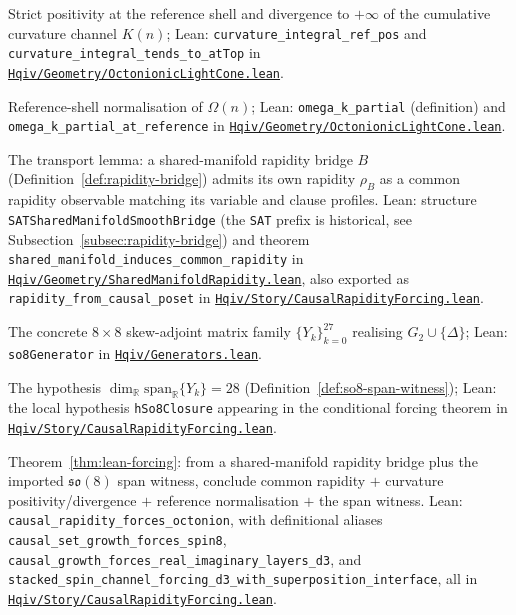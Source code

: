 \documentclass[11pt]{amsart}
\newcommand{\leanrepo}{https://github.com/HQIV/hqiv-lean/blob/main}
\newcommand{\leanfile}[1]{\href{\leanrepo/#1}{\nolinkurl{#1}}}
\newcommand{\leanid}[1]{\nolinkurl{#1}}
\begin{document}
\begin{description}[leftmargin=*]
  \item[\phantomsection\label{lean:curvature-int}\textbf{Curvature integral positivity and divergence.}]
    Strict positivity at the reference shell and divergence to \(+\infty\) of the cumulative curvature channel \(K(n)\); Lean: \leanid{curvature_integral_ref_pos} and \leanid{curvature_integral_tends_to_atTop} in \leanfile{Hqiv/Geometry/OctonionicLightCone.lean}.

  \item[\phantomsection\label{lean:omega-ref}\textbf{Reference-shell $\Omega = 1$ identity.}]
    Reference-shell normalisation of \(\Omega(n)\); Lean: \leanid{omega_k_partial} (definition) and \leanid{omega_k_partial_at_reference} in \leanfile{Hqiv/Geometry/OctonionicLightCone.lean}.

  \item[\phantomsection\label{lean:rapidity-induces}\textbf{Shared-rapidity transport lemma.}]
    The transport lemma: a shared-manifold rapidity bridge \(B\) (Definition~\ref{def:rapidity-bridge}) admits its own rapidity \(\rho_B\) as a common rapidity observable matching its variable and clause profiles. Lean: structure \leanid{SATSharedManifoldSmoothBridge} (the \texttt{SAT} prefix is historical, see Subsection~\ref{subsec:rapidity-bridge}) and theorem \leanid{shared_manifold_induces_common_rapidity} in \leanfile{Hqiv/Geometry/SharedManifoldRapidity.lean}, also exported as \leanid{rapidity_from_causal_poset} in \leanfile{Hqiv/Story/CausalRapidityForcing.lean}.

  \item[\phantomsection\label{lean:so8-generators}\textbf{Octonionic seed (28-generator family).}]
    The concrete \(8\times 8\) skew-adjoint matrix family \(\{Y_k\}_{k=0}^{27}\) realising \(G_2\cup\{\Delta\}\); Lean: \leanid{so8Generator} in \leanfile{Hqiv/Generators.lean}.

  \item[\phantomsection\label{lean:so8-witness}\textbf{Imported $\mathfrak{so}(8)$ span witness.}]
    The hypothesis \(\dim_{\mathbb{R}}\mathrm{span}_{\mathbb{R}}\{Y_k\}=28\) (Definition~\ref{def:so8-span-witness}); Lean: the local hypothesis \leanid{hSo8Closure} appearing in the conditional forcing theorem in \leanfile{Hqiv/Story/CausalRapidityForcing.lean}.

  \item[\phantomsection\label{lean:forcing-theorem}\textbf{Conditional forcing theorem.}]
    Theorem~\ref{thm:lean-forcing}: from a shared-manifold rapidity bridge plus the imported \(\mathfrak{so}(8)\) span witness, conclude common rapidity \(+\) curvature positivity/divergence \(+\) reference normalisation \(+\) the span witness. Lean: \leanid{causal_rapidity_forces_octonion}, with definitional aliases \leanid{causal_set_growth_forces_spin8}, \leanid{causal_growth_forces_real_imaginary_layers_d3}, and \leanid{stacked_spin_channel_forcing_d3_with_superposition_interface}, all in \leanfile{Hqiv/Story/CausalRapidityForcing.lean}.
\end{description}
\endgroup
\end{document}

